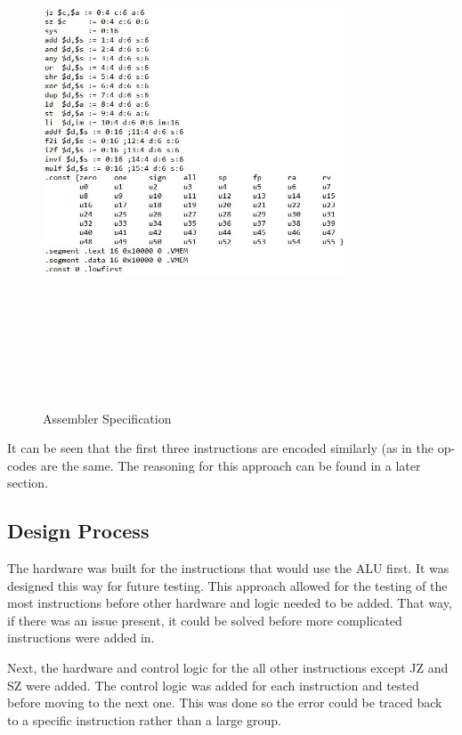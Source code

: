 \documentclass[conference]{IEEEtran}
\begin{document}
\begin{figure}
	\caption{Assembler Specification}
	\centering
	\includegraphics[width = 9cm, height=15cm,keepaspectratio]{assembler.png}
	\label{fig:assemblerSpec}
\end{figure}

It can be seen that the first three instructions are encoded similarly (as in the op-codes are the same.
The reasoning for this approach can be found in a later section.


\subsection{Design Process}
The hardware was built for the instructions that would use the ALU first. It was designed this way for future testing. This approach allowed for the testing of the most instructions before other hardware and logic needed to be added. That way, if there was an issue present, it could be solved before more complicated instructions were added in. 

Next, the hardware and control logic for the all other instructions except JZ and SZ were added. The control logic was added for each instruction and tested before moving to the next one. This was done so the error could be traced back to a specific instruction rather than a large group. 
\end{document}
